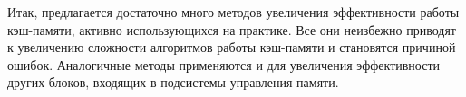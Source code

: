 Итак, предлагается достаточно много методов увеличения эффективности работы кэш-памяти, активно использующихся на практике. Все они неизбежно приводят к увеличению сложности алгоритмов работы кэш-памяти и становятся причиной ошибок. Аналогичные методы применяются и для увеличения эффективности других блоков, входящих в подсистемы управления памяти.





%

